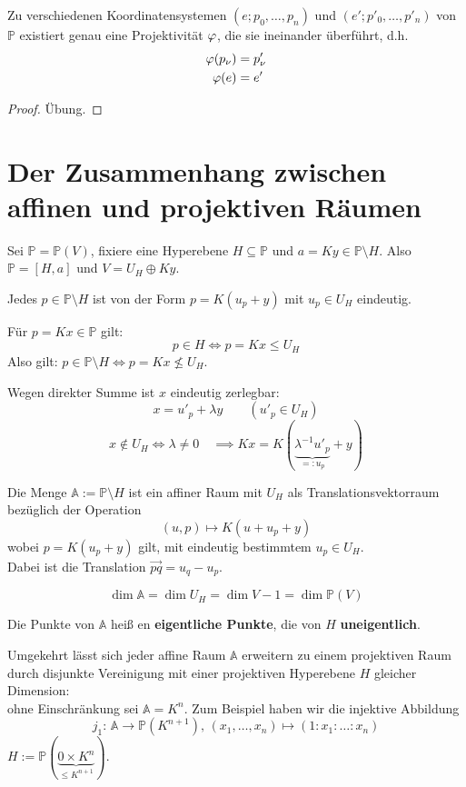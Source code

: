 \documentclass[parskip,a4paper,twoside,DIV15,BCOR12mm]{scrbook}
\begin{document}
\begin{theo}
\label{Satz 24.2}
Zu verschiedenen Koordinatensystemen \((e;p_{0},\ldots,p_{n})\) und
\((e';p'_{0},\ldots,p'_{n})\) von \(\mathbb{P}\) existiert genau eine 
Projektivität \(\varphi\), die sie ineinander überführt, d.h.
\begin{align*}
\varphi(p_{\nu})&=p'_{\nu}\\
\varphi(e)&=e'
\end{align*}
\end{theo}
\begin{proof}
Übung.
\end{proof}
\section{Der Zusammenhang zwischen affinen und projektiven Räumen}
Sei \(\mathbb{P}=\mathbb{P}(V)\), fixiere eine Hyperebene 
\(H\subseteq\mathbb{P}\) und \(a=Ky\in\mathbb{P}\setminus H\). Also 
\(\mathbb{P}=[H,a]\) und \(V=U_{H}\oplus Ky\).
\begin{prerem}
Jedes \(p\in\mathbb{P}\setminus H\) ist von der Form \(p=K(u_{p}+y)\) mit
\(u_{p}\in U_{H}\) eindeutig.

Für \(p=Kx\in\mathbb{P}\) gilt:
\[
p\in H\Longleftrightarrow p=Kx\leq U_{H}
\]
Also gilt: \(p\in\mathbb{P}\setminus H\Longleftrightarrow p=Kx\not\leq U_{H}\).

Wegen direkter Summe ist \(x\) eindeutig zerlegbar:
\[
x=u'_{p}+\lambda y\qquad(u'_{p}\in U_{H})
\]
\[
x\not\in U_{H}\Longleftrightarrow\lambda\neq0\quad
    \implies Kx=K(\underbrace{\lambda^{-1}u'_{p}}_{=:u_{p}}+y)
\]
\end{prerem}
\begin{theo}
\label{Satz 24.3}
Die Menge \(\mathbb{A}:=\mathbb{P}\setminus H\) ist ein affiner Raum mit 
\(U_{H}\) als Translationsvektorraum bezüglich der Operation
\[
(u,p)\mapsto K(u+u_{p}+y)
\]
wobei \(p=K(u_{p}+y)\) gilt, mit eindeutig bestimmtem \(u_{p}\in U_{H}\).\\
Dabei ist die Translation \(\overrightarrow{pq}=u_{q}-u_{p}\).
\end{theo}
\begin{note}
\[
\dim\mathbb{A}=\dim U_{H}=\dim V-1=\dim\mathbb{P}(V)
\]
\end{note}
\begin{definition}
Die Punkte von \(\mathbb{A}\) heiß en \textbf{eigentliche Punkte}, die von
\(H\) \textbf{uneigentlich}.
\end{definition}
Umgekehrt lässt sich jeder affine Raum \(\mathbb{A}\) erweitern zu einem 
projektiven Raum durch disjunkte Vereinigung mit einer projektiven Hyperebene
\(H\) gleicher Dimension:\\
ohne Einschränkung sei \(\mathbb{A}=K^{n}\). Zum Beispiel haben wir die
injektive Abbildung
\[
j_{1}:\,\mathbb{A}\to\mathbb{P}(K^{n+1}),\,
    (x_{1},\ldots,x_{n})\mapsto(1:x_{1}:\ldots:x_{n})
\]
\(H:=\mathbb{P}(\underbrace{0\times K^{n}}_{\leq K^{n+1}})\).
\end{document}
